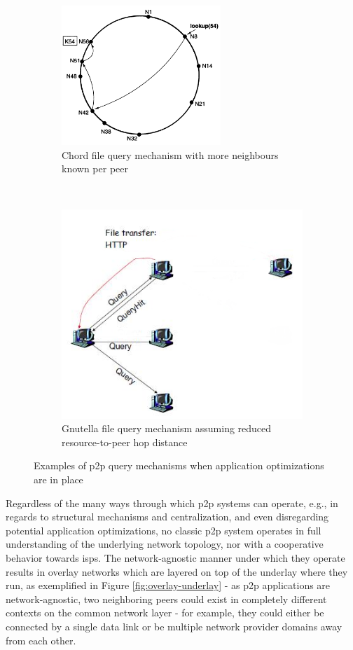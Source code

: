 \begin{figure}[t!h]
    \centering
    \begin{subfigure}[t]{0.4\textwidth}
    \centering
    \includegraphics[width=6cm]{img/chord-lookup-efficient.png}
    \caption{Chord file query mechanism with more neighbours known per peer \cite{stoica2003}}
    \label{fig:chord2}
    \end{subfigure}
    ~
    \begin{subfigure}[t]{0.4\textwidth}
    \centering
    \includegraphics[witdh=6cm]{img/gnutella-flood-efficient.png}
    \caption{Gnutella file query mechanism assuming reduced resource-to-peer hop distance}
    \label{fig:gnutella2}
    \end{subfigure}
    
\caption{Examples of \gls{p2p} query mechanisms when application optimizations are in place}
\label{fig:p2p-optimization}
\end{figure}

    Regardless of the many ways through which \gls{p2p} systems can operate, e.g., in regards to structural mechanisms and centralization, and even disregarding potential application optimizations, no classic \gls{p2p} system operates in full understanding of the underlying network topology, nor with a cooperative behavior towards \glspl{isp}.
    The network-agnostic manner under which they operate results in overlay networks which are layered on top of the underlay where they run, as exemplified in Figure \ref{fig:overlay-underlay} - as \gls{p2p} applications are network-agnostic, two neighboring peers could exist in completely different contexts on the common network layer - for example, they could either be connected by a single data link or be multiple network provider domains away from each other.

